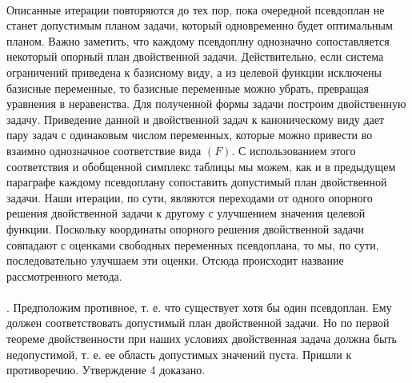  \\

Описанные итерации повторяются до тех пор, пока очередной псевдоплан не станет допустимым планом задачи, который одновременно будет оптимальным планом. Важно заметить, что каждому псевдоплну однозначно сопоставляется некоторый опорный план двойственной задачи. Действительно, если система ограничений приведена к базисному виду, а из целевой функции исключены базисные переменные, то базисные переменные можно убрать, превращая уравнения в неравенства. Для полученной формы задачи построим двойственную задачу. Приведение данной и двойственной задач к каноническому виду дает пару задач с одинаковым числом переменных, которые можно привести во взаимно однозначное соответствие вида $(F)$. С использованием этого соответствия и обобщенной симплекс таблицы мы можем, как и в предыдущем параграфе каждому псевдоплану сопоставить допустимый план двойственной задачи. Наши итерации, по сути, являются переходами от одного опорного решения двойственной задачи к другому с улучшением значения целевой функции.  Поскольку координаты опорного решения двойственной задачи совпадают с оценками свободных переменных псевдоплана, то мы, по сути, последовательно улучшаем эти оценки. Отсюда происходит название рассмотренного метода. \\

 \\

. Предположим противное, т. е. что существует хотя бы один псевдоплан. Ему должен соответствовать допустимый план двойственной задачи. Но по первой теореме двойственности при наших условиях двойственная задача должна быть недопустимой, т. е. ее область допустимых значений пуста. Пришли к противоречию. Утверждение 4 доказано.


